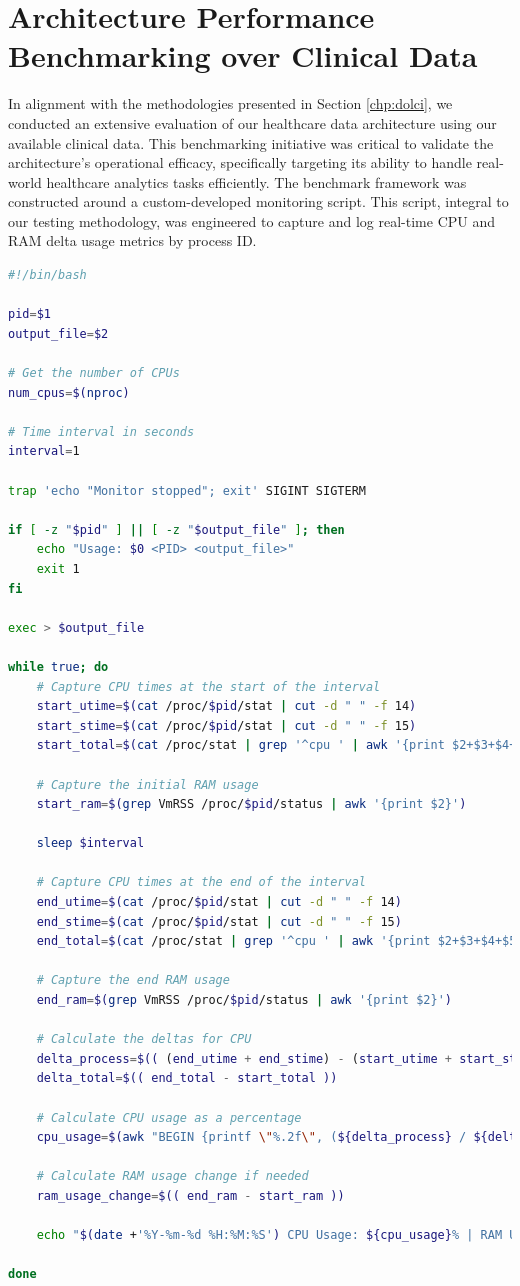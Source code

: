 \section{Architecture Performance Benchmarking over Clinical Data}
In alignment with the methodologies presented in Section \ref{chp:dolci}, we conducted an extensive evaluation of our healthcare data architecture using our available clinical data. This benchmarking initiative was critical to validate the architecture's operational efficacy, specifically targeting its ability to handle real-world healthcare analytics tasks efficiently.
The benchmark framework was constructed around a custom-developed monitoring script. This script, integral to our testing methodology, was engineered to capture and log real-time \ac{CPU} and \ac{RAM} delta usage metrics by process ID.
\begin{lstlisting}[language=bash, caption={Custom Monitor Script for Performance Tracking}, label={lst}] 
#!/bin/bash

pid=$1
output_file=$2

# Get the number of CPUs
num_cpus=$(nproc)

# Time interval in seconds
interval=1

trap 'echo "Monitor stopped"; exit' SIGINT SIGTERM

if [ -z "$pid" ] || [ -z "$output_file" ]; then
    echo "Usage: $0 <PID> <output_file>"
    exit 1
fi

exec > $output_file

while true; do
    # Capture CPU times at the start of the interval
    start_utime=$(cat /proc/$pid/stat | cut -d " " -f 14)
    start_stime=$(cat /proc/$pid/stat | cut -d " " -f 15)
    start_total=$(cat /proc/stat | grep '^cpu ' | awk '{print $2+$3+$4+$5+$6+$7+$8}')

    # Capture the initial RAM usage
    start_ram=$(grep VmRSS /proc/$pid/status | awk '{print $2}')

    sleep $interval

    # Capture CPU times at the end of the interval
    end_utime=$(cat /proc/$pid/stat | cut -d " " -f 14)
    end_stime=$(cat /proc/$pid/stat | cut -d " " -f 15)
    end_total=$(cat /proc/stat | grep '^cpu ' | awk '{print $2+$3+$4+$5+$6+$7+$8}')

    # Capture the end RAM usage
    end_ram=$(grep VmRSS /proc/$pid/status | awk '{print $2}')

    # Calculate the deltas for CPU
    delta_process=$(( (end_utime + end_stime) - (start_utime + start_stime) ))
    delta_total=$(( end_total - start_total ))

    # Calculate CPU usage as a percentage
    cpu_usage=$(awk "BEGIN {printf \"%.2f\", (${delta_process} / ${delta_total}) * 100 * ${num_cpus}}")

    # Calculate RAM usage change if needed
    ram_usage_change=$(( end_ram - start_ram ))

    echo "$(date +'%Y-%m-%d %H:%M:%S') CPU Usage: ${cpu_usage}% | RAM Usage Change: ${ram_usage_change} kB"

done
\end{lstlisting}

